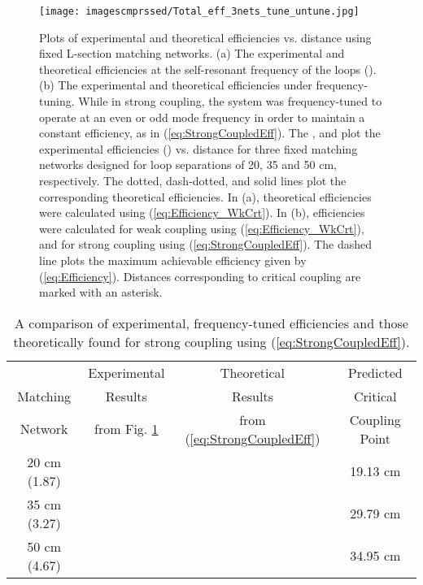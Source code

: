\documentclass[journal]{IEEEtran}
\begin{document}
\begin{figure}[htbp]
    \centering
    \texttt{[image: imagescmprssed/Total\_eff\_3nets\_tune\_untune.jpg]}
    \caption{Plots of experimental and theoretical efficiencies vs. distance using fixed L-section matching networks. (a) The experimental and theoretical efficiencies at the self-resonant frequency of the loops (). (b) The experimental and theoretical efficiencies under frequency-tuning. While in strong coupling, the system was frequency-tuned to operate at an even or odd mode frequency in order to maintain a constant efficiency, as in (\ref{eq:StrongCoupledEff}). The , and  plot the experimental efficiencies () vs. distance for three fixed matching networks designed for loop separations of 20, 35 and 50 cm, respectively. The dotted, dash-dotted, and solid lines plot the corresponding theoretical efficiencies. In (a), theoretical efficiencies were calculated using (\ref{eq:Efficiency_WkCrt}). In (b), efficiencies were calculated for weak coupling using (\ref{eq:Efficiency_WkCrt}), and for strong coupling using (\ref{eq:StrongCoupledEff}). The dashed line plots the maximum achievable efficiency given by (\ref{eq:Efficiency}). Distances corresponding to critical coupling are marked with an asterisk.}
    \label{fig:S21_v_Pow}
\end{figure}

\begin{table}[htbp]
\centering
\begin{tabular}{|c|c|c|c|}
\hline
                & {Experimental}                    & {Theoretical}                         &  {Predicted} \\
 {Matching}     & {Results}                         & {Results}                             &  {Critical} \\
 {Network}      & {from Fig. \ref{fig:S21_v_Pow}}   & {from (\ref{eq:StrongCoupledEff})}   & {Coupling Point} \\ \hline
20 cm (1.87) &                          &                              & 19.13 cm \\ \hline
35 cm (3.27) &                          &                               & 29.79 cm \\ \hline
50 cm (4.67) &                          &                               & 34.95 cm \\ \hline
\end{tabular}
\caption{A comparison of experimental, frequency-tuned efficiencies and those theoretically found for strong coupling using (\ref{eq:StrongCoupledEff}).}
\label{table:ExpTheory_Comp}
\end{table}
\end{document}
